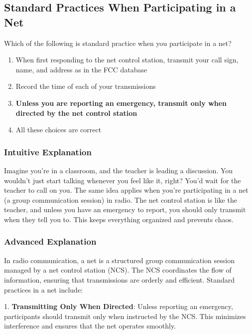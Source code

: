 \subsection{Standard Practices When Participating in a Net}
\label{T2C07}

\begin{tcolorbox}[colback=gray!10!white,colframe=black!75!black,title=T2C07]
Which of the following is standard practice when you participate in a net?
\begin{enumerate}[label=\Alph*]
    \item When first responding to the net control station, transmit your call sign, name, and address as in the FCC database
    \item Record the time of each of your transmissions
    \item \textbf{Unless you are reporting an emergency, transmit only when directed by the net control station}
    \item All these choices are correct
\end{enumerate}
\end{tcolorbox}

\subsubsection{Intuitive Explanation}
Imagine you're in a classroom, and the teacher is leading a discussion. You wouldn't just start talking whenever you feel like it, right? You'd wait for the teacher to call on you. The same idea applies when you're participating in a net (a group communication session) in radio. The net control station is like the teacher, and unless you have an emergency to report, you should only transmit when they tell you to. This keeps everything organized and prevents chaos.

\subsubsection{Advanced Explanation}
In radio communication, a net is a structured group communication session managed by a net control station (NCS). The NCS coordinates the flow of information, ensuring that transmissions are orderly and efficient. Standard practices in a net include:

1. \textbf{Transmitting Only When Directed}: Unless reporting an emergency, participants should transmit only when instructed by the NCS. This minimizes interference and ensures that the net operates smoothly.


